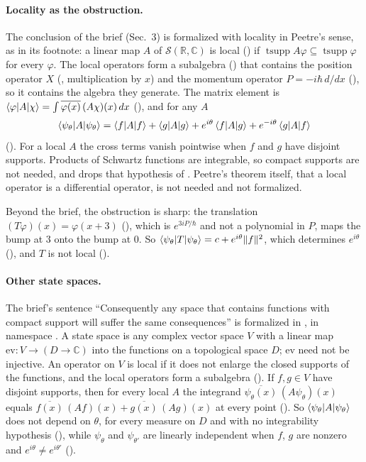 \documentclass[11pt]{article}
\begin{document}
\paragraph{Locality as the obstruction.} The conclusion of the brief (Sec.~3) is formalized with
locality in Peetre's sense, as in its footnote: a linear map $A$ of $\mathcal{S}(\mathbb{R},
\mathbb{C})$ is local () if $\operatorname{tsupp} A\varphi \subseteq
\operatorname{tsupp}\varphi$ for every $\varphi$. The local operators form a subalgebra
() that contains the position operator $X$ (, multiplication by $x$) and
the momentum operator $P = -i\hbar\, d/dx$ (), so it contains the algebra they generate.
The matrix element is $\braket{\varphi|A|\chi} = \int \overline{\varphi(x)}\,(A\chi)(x)\,dx$
(), and for any $A$
\[
  \braket{\psi_\theta|A|\psi_\theta} = \braket{f|A|f} + \braket{g|A|g}
    + e^{i\theta}\braket{f|A|g} + e^{-i\theta}\braket{g|A|f}
\]
(). For a local $A$ the cross terms vanish pointwise when $f$ and $g$ have
disjoint supports. Products of Schwartz functions are integrable, so compact supports are not
needed, and  drops that hypothesis of . Peetre's
theorem itself, that a local operator is a differential operator, is not needed and not
formalized.

Beyond the brief, the obstruction is sharp: the translation $(T\varphi)(x) = \varphi(x+3)$
(), which is $e^{3iP/\hbar}$ and not a polynomial in $P$, maps the bump at $3$
onto the bump at $0$. So $\braket{\psi_\theta|T|\psi_\theta} = c + e^{i\theta}\|f\|^2$, which
determines $e^{i\theta}$ (), and $T$ is not local
().

\paragraph{Other state spaces.} The brief's sentence ``Consequently any space that contains
functions with compact support will suffer the same consequences'' is formalized in
, in namespace . A state space is
any complex vector space $V$ with a linear map $\mathrm{ev}\colon V \to (D \to \mathbb{C})$ into
the functions on a topological space $D$; $\mathrm{ev}$ need not be injective. An operator on $V$
is local if it does not enlarge the closed supports of the functions, and the local operators
form a subalgebra (). If $f, g \in V$ have disjoint supports, then for
every local $A$ the integrand $\overline{\psi_\theta(x)}\,(A\psi_\theta)(x)$ equals
$\overline{f(x)}\,(Af)(x) + \overline{g(x)}\,(Ag)(x)$ at every point
(). So $\braket{\psi_\theta|A|\psi_\theta}$ does not depend on
$\theta$, for every measure on $D$ and with no integrability hypothesis
(), while $\psi_\theta$ and $\psi_{\theta'}$ are linearly
independent when $f$, $g$ are nonzero and $e^{i\theta} \ne e^{i\theta'}$
().
\end{document}
